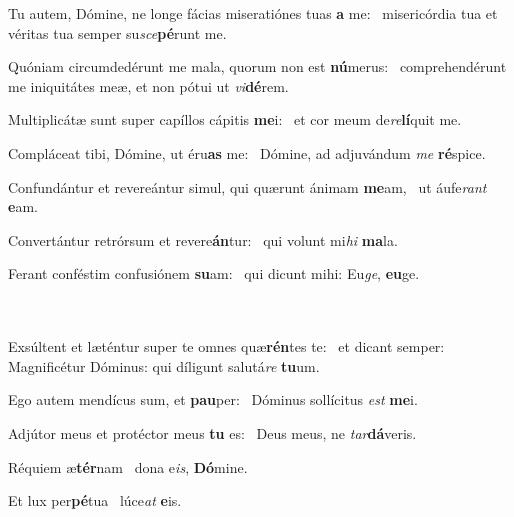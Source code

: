 \item Tu autem, Dómine, ne longe fácias miseratiónes tuas \textbf{a} me:~\psstar{} misericórdia tua et véritas tua semper su\textit{sce}\textbf{pé}runt me.

\item Quóniam circumdedérunt me mala, quorum non est \textbf{nú}merus:~\psstar{} comprehendérunt me iniquitátes meæ, et non pótui ut \textit{vi}\textbf{dé}rem.

\item Multiplicátæ sunt super capíllos cápitis \textbf{me}i:~\psstar{} et cor meum de\textit{re}\textbf{lí}quit me.

\item Compláceat tibi, Dómine, ut éru\textbf{as} me:~\psstar{} Dómine, ad adjuvándum \textit{me} \textbf{ré}spice.

\item Confundántur et revereántur simul, qui quærunt ánimam \textbf{me}am,~\psstar{} ut áufe\textit{rant} \textbf{e}am.

\item Convertántur retrórsum et revere\textbf{án}tur:~\psstar{} qui volunt mi\textit{hi} \textbf{ma}la.

\item Ferant conféstim confusiónem \textbf{su}am:~\psstar{} qui dicunt mihi: Eu\textit{ge}, \textbf{eu}ge.

\item ~\\~\\Exsúltent et læténtur super te omnes quæ\textbf{rén}tes te:~\psstar{} et dicant semper: Magnificétur Dóminus: qui díligunt salutá\textit{re} \textbf{tu}um.

\item Ego autem mendícus sum, et \textbf{pau}per:~\psstar{} Dóminus sollícitus \textit{est} \textbf{me}i.

\item Adjútor meus et protéctor meus \textbf{tu} es:~\psstar{} Deus meus, ne \textit{tar}\textbf{dá}veris.

\item Réquiem æ\textbf{tér}nam~\psstar{} dona e\textit{is}, \textbf{Dó}mine.

\item Et lux per\textbf{pé}tua~\psstar{} lúce\textit{at} \textbf{e}is.